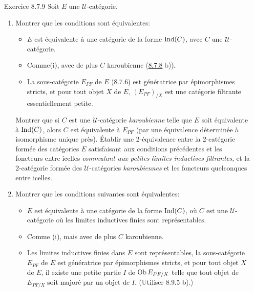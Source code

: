\documentclass[10pt]{../fichiers-configuration-latex/smfart}
\def\labelenumi{(\theenumi)}
\begin{document}
\begin{enonce*}[remark]{Exercice 8.7.9}
Soit $E$ une $𝒰$-catégorie.
\begin{enumerate}
\renewcommand{\theenumi}{\alph{enumi}}
\renewcommand{\labelenumi}{\theenumi)}
\item Montrer que les conditions sont équivalentes:

\begin{itemize}
\item[(i)] $E$ est équivalente à une catégorie de la forme
$\operatorname{Ind}(C)$, avec $C$ une $𝒰$-catégorie.

\item[(i bis)] Comme\pageoriginale (i), avec de plus $C$ karoubienne
(\hyperref[I.exer8.7.8]{8.7.8} b)).

\item[(ii)] La sous-catégorie $E_{PF}$ de $E$ (\hyperref[I.cor8.7.6]{8.7.6}) est
génératrice par épimorphismes stricts, et pour tout objet $X$ de
$E$, $(E_{PF})_{/X}$ est une catégorie filtrante essentiellement
petite.
\end{itemize}

Montrer que si $C$ est une $𝒰$-catégorie \emph{karoubienne}
telle que $E$ soit équivalente à $\operatorname{Ind}(C)$, alors $C$ est
équivalente à $E_{PF}$ (par une équivalence déterminée à
isomorphisme unique près). Établir une 2-équivalence entre la
2-catégorie formée des catégories $E$ satisfaisant aux conditions
précédentes et les foncteurs entre icelles \emph{commutant aux
petites limites inductives filtrantes,} et la 2-catégorie formée des
$𝒰$-catégories \emph{karoubiennes} et les foncteurs
quelconques entre icelles.

\item Montrer que les conditions suivantes sont équivalentes:

\begin{itemize}
\item[(i)] $E$ est équivalente à une catégorie de la forme
$\operatorname{Ind}(C)$, où $C$ est une $𝒰$-catégorie où les limites
inductives finies sont représentables.

\item[(i bis)] Comme (i), mais avec de plus $C$ karoubienne.

\item[(ii)] Les limites inductives finies dans $E$ sont
représentables, la sous-catégorie $E_{PF}$ de $E$ est génératrice
par épimorphismes stricts, et pour tout objet $X$ de $E$, il existe
une petite partie $I$ de $\operatorname{Ob} E_{PF/X}$ telle que tout objet de
$E_{PF/X}$ soit majoré par un objet de $I$. (Utiliser 8.9.5 b).)
\end{itemize}
\end{enumerate}
\end{enonce*}
\end{document}
